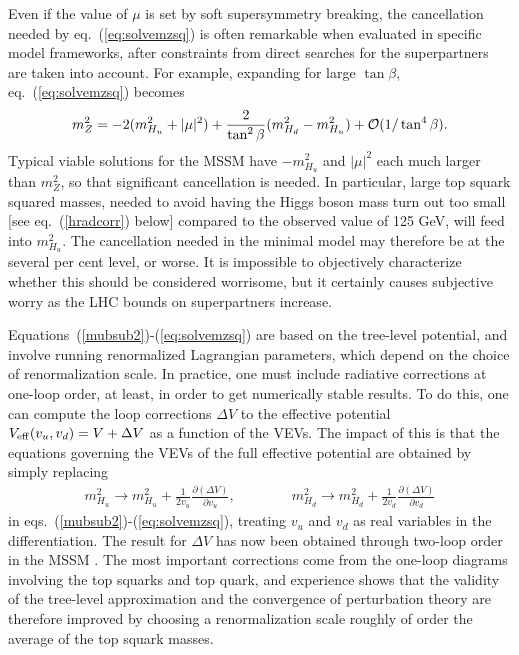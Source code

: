 \documentclass[11pt]{article}
\def\beq{\begin{eqnarray}}
\def\eeq{\end{eqnarray}}
\begin{document}
Even if the value of $\mu$ is set by soft supersymmetry breaking, the 
cancellation needed by eq.~(\ref{eq:solvemzsq}) is often remarkable when 
evaluated in specific model frameworks, after constraints from direct 
searches for the superpartners are taken into account. 
For example, expanding for large $\tan\beta$, eq.~(\ref{eq:solvemzsq}) 
becomes
\beq
m_Z^2 = -2 (m^2_{H_u} + |\mu|^2) 
+ \frac{2}{\tan^2\beta} (m^2_{H_d} - m^2_{H_u})
+ {\cal O}(1/\tan^4\beta).
\eeq
Typical viable solutions for the MSSM have $-m^2_{H_u}$ and $|\mu|^2$ each 
much larger than $m_Z^2$, so that significant cancellation is needed. In 
particular, large top squark squared masses, needed to avoid having the 
Higgs boson mass turn out too small [see eq.~(\ref{hradcorr}) below] 
compared to the observed value of 125 GeV, will feed into $m^2_{H_u}$. 
The cancellation needed in the minimal model may therefore be at the 
several per cent level, or worse. It is impossible to objectively characterize 
whether this should be considered worrisome, but it certainly causes
subjective worry as the LHC bounds on superpartners increase.

Equations~(\ref{mubsub2})-(\ref{eq:solvemzsq}) 
are based on the tree-level potential, and involve 
running renormalized Lagrangian parameters, which depend on the choice of 
renormalization scale. In practice, one must include radiative corrections 
at one-loop order, at least, in order to get numerically stable results. 
To do this, one can compute the loop corrections $\Delta V$ to the 
effective potential $V_{\rm eff}(v_u, v_d) = V + \Delta V$ as a function 
of the VEVs. The impact of this is that the equations governing the VEVs 
of the full effective potential are obtained by simply replacing
\beq
m^2_{H_u} \rightarrow m^2_{H_u} + \frac{1}{2 v_u} 
\frac{\partial (\Delta V)}{\partial v_u},\qquad\qquad
m^2_{H_d} \rightarrow m^2_{H_d} + \frac{1}{2 v_d} 
\frac{\partial (\Delta V)}{\partial v_d}
\label{eq:Vradcor}
\eeq
in eqs.~(\ref{mubsub2})-(\ref{eq:solvemzsq}), treating $v_u$ and $v_d$ 
as real variables in the differentiation. 
The result for $\Delta V$ has now been obtained through two-loop 
order in the MSSM \cite{twoloopEP,twoloopEPMSSM}. The most important 
corrections come from 
the one-loop diagrams involving the top squarks and top quark, and 
experience shows that the validity of the tree-level approximation and 
the convergence of perturbation theory are therefore improved by choosing 
a renormalization scale roughly of order the average of the top squark masses.
\end{document}
